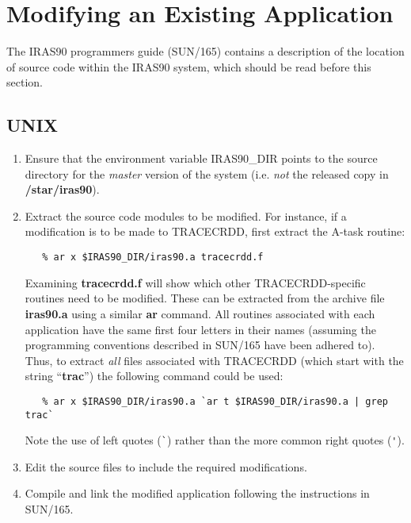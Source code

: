\section{Modifying an Existing Application}
The {\small IRAS90} programmers guide (SUN/165) contains a description of the 
location of source code within the {\small IRAS90} system, which should be read 
before this section.

\subsection{UNIX}
\begin{enumerate}
\item Ensure that the environment variable {\small IRAS90\_DIR} points to the
source directory for the {\em master} version of the system (i.e. {\em not} the
released copy in {\bf /star/iras90}).
\item Extract the source code modules to be modified. For instance, if a 
modification is to be made to {\small TRACECRDD}, first extract the A-task 
routine:

\small
\begin{verbatim}
   % ar x $IRAS90_DIR/iras90.a tracecrdd.f
\end{verbatim}
\normalsize


Examining {\bf tracecrdd.f} will show which other {\small TRACECRDD}-specific
routines need to be modified. These can be extracted from the archive file {\bf
iras90.a} using a similar {\bf ar} command. All routines associated with each
application have the same first four letters in their names (assuming the
programming conventions described in SUN/165 have been adhered to). Thus, to
extract {\em all} files associated with {\small TRACECRDD} (which start
with the string ``{\bf trac}'') the following command could be used: 

\small
\begin{verbatim}
   % ar x $IRAS90_DIR/iras90.a `ar t $IRAS90_DIR/iras90.a | grep trac`
\end{verbatim}
\normalsize

Note the use of left quotes (\verb+`+) rather than the more common right quotes 
(\verb+'+).

\item Edit the source files to include the required modifications.

\item Compile and link the modified application following the instructions 
in SUN/165.


\end{enumerate}
